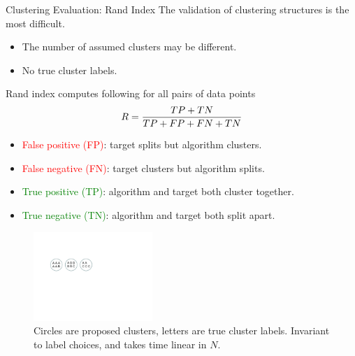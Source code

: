 \documentclass[10pt,mathserif]{beamer}
\begin{document}
\begin{frame}{Clustering Evaluation: Rand Index}
The validation of clustering structures is the most difficult.
\begin{itemize}
    \item The number of assumed clusters may be different.
    \item No true cluster labels.
\end{itemize}    
\bigskip
Rand index computes following for all pairs of data points 
\begin{equation*}\small
    R = \frac{TP+TN}{TP +FP +FN +TN}
\end{equation*}
\begin{itemize}
    \item \textcolor{red}{False positive (FP)}: target splits but algorithm clusters.
    \item \textcolor{red}{False negative (FN)}: target clusters but algorithm splits.
    \item \textcolor{green}{True positive (TP)}: algorithm and target both cluster together.
    \item \textcolor{green}{True negative (TN)}: algorithm and target both split apart.
\end{itemize}

\begin{figure}[h]
\centering
\includegraphics[width=0.4\textwidth]{clusterPurity}
\caption{Circles are proposed clusters, letters are true cluster labels. Invariant to label choices, and takes time linear in $N$. }
\end{figure} 
\end{frame}
\end{document}
